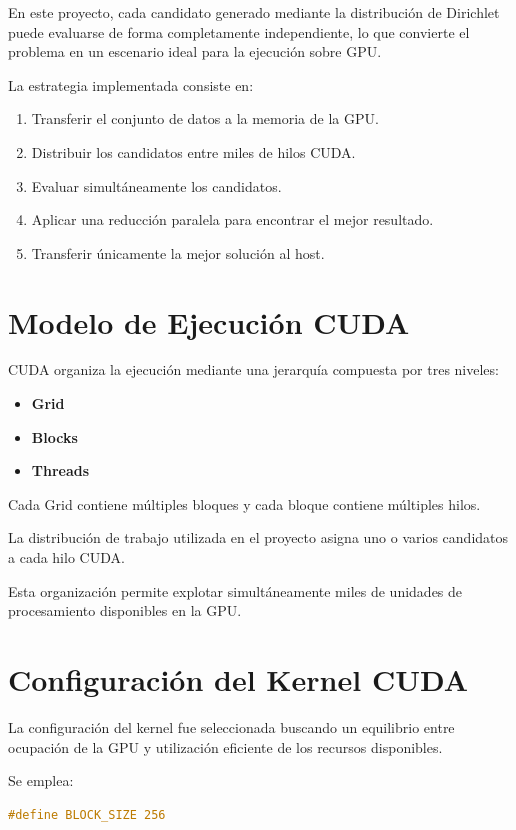 En este proyecto, cada candidato generado mediante la distribución de Dirichlet puede evaluarse de forma completamente independiente, lo que convierte el problema en un escenario ideal para la ejecución sobre GPU.

La estrategia implementada consiste en:

\begin{enumerate}
    \item Transferir el conjunto de datos a la memoria de la GPU.
    \item Distribuir los candidatos entre miles de hilos CUDA.
    \item Evaluar simultáneamente los candidatos.
    \item Aplicar una reducción paralela para encontrar el mejor resultado.
    \item Transferir únicamente la mejor solución al host.
\end{enumerate}

\section{Modelo de Ejecución CUDA}

CUDA organiza la ejecución mediante una jerarquía compuesta por tres niveles:

\begin{itemize}
    \item \textbf{Grid}
    \item \textbf{Blocks}
    \item \textbf{Threads}
\end{itemize}

Cada Grid contiene múltiples bloques y cada bloque contiene múltiples hilos.

La distribución de trabajo utilizada en el proyecto asigna uno o varios candidatos a cada hilo CUDA.

Esta organización permite explotar simultáneamente miles de unidades de procesamiento disponibles en la GPU.

\section{Configuración del Kernel CUDA}

La configuración del kernel fue seleccionada buscando un equilibrio entre ocupación de la GPU y utilización eficiente de los recursos disponibles.

Se emplea:

\begin{lstlisting}[language=C,
caption={Tamaño de bloque utilizado por el kernel CUDA},
label={lst:block_size}]
#define BLOCK_SIZE 256
\end{lstlisting}

